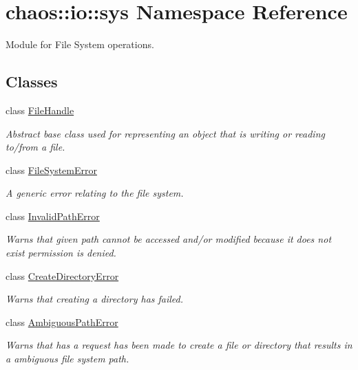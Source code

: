 \hypertarget{namespacechaos_1_1io_1_1sys}{\section{chaos\-:\-:io\-:\-:sys Namespace Reference}
\label{namespacechaos_1_1io_1_1sys}
}


Module for File System operations.  


\subsection*{Classes}
\begin{DoxyCompactItemize}
\item 
class \hyperlink{classchaos_1_1io_1_1sys_1_1_file_handle}{File\-Handle}
\begin{DoxyCompactList}\small\item\em Abstract base class used for representing an object that is writing or reading to/from a file. \end{DoxyCompactList}\item 
class \hyperlink{classchaos_1_1io_1_1sys_1_1_file_system_error}{File\-System\-Error}
\begin{DoxyCompactList}\small\item\em A generic error relating to the file system. \end{DoxyCompactList}\item 
class \hyperlink{classchaos_1_1io_1_1sys_1_1_invalid_path_error}{Invalid\-Path\-Error}
\begin{DoxyCompactList}\small\item\em Warns that given path cannot be accessed and/or modified because it does not exist permission is denied. \end{DoxyCompactList}\item 
class \hyperlink{classchaos_1_1io_1_1sys_1_1_create_directory_error}{Create\-Directory\-Error}
\begin{DoxyCompactList}\small\item\em Warns that creating a directory has failed. \end{DoxyCompactList}\item 
class \hyperlink{classchaos_1_1io_1_1sys_1_1_ambiguous_path_error}{Ambiguous\-Path\-Error}
\begin{DoxyCompactList}\small\item\em Warns that has a request has been made to create a file or directory that results in a ambiguous file system path. \end{DoxyCompactList}\item 

\end{DoxyCompactItemize}
